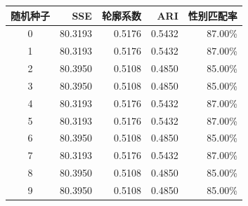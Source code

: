 \begin{tabular}{crrrr}
\toprule
随机种子 & SSE & 轮廓系数 & ARI & 性别匹配率 \\
\midrule
0 & 80.3193 & 0.5176 & 0.5432 & 87.00\% \\
1 & 80.3193 & 0.5176 & 0.5432 & 87.00\% \\
2 & 80.3950 & 0.5108 & 0.4850 & 85.00\% \\
3 & 80.3950 & 0.5108 & 0.4850 & 85.00\% \\
4 & 80.3193 & 0.5176 & 0.5432 & 87.00\% \\
5 & 80.3193 & 0.5176 & 0.5432 & 87.00\% \\
6 & 80.3950 & 0.5108 & 0.4850 & 85.00\% \\
7 & 80.3193 & 0.5176 & 0.5432 & 87.00\% \\
8 & 80.3950 & 0.5108 & 0.4850 & 85.00\% \\
9 & 80.3950 & 0.5108 & 0.4850 & 85.00\% \\
\bottomrule
\end{tabular}
